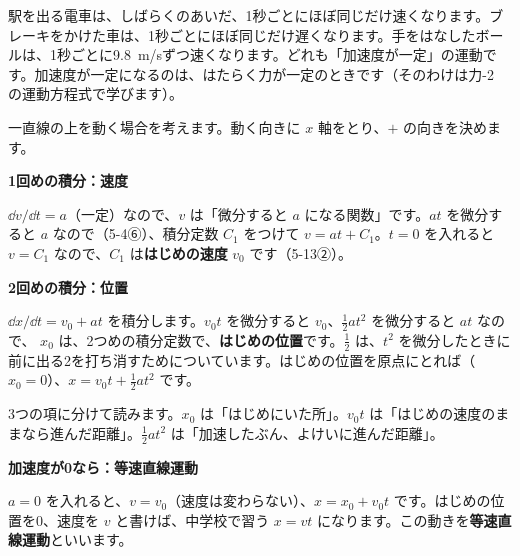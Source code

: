 
\leavevmode\label{ph:力-1:sec3}駅を出る電車は、しばらくのあいだ、1秒ごとにほぼ同じだけ速くなります。ブレーキをかけた車は、1秒ごとにほぼ同じだけ遅くなります。手をはなしたボールは、1秒ごとに\qty{9.8}{m/s}ずつ速くなります。どれも「加速度が一定」の運動です。加速度が一定になるのは、はたらく力が一定のときです（そのわけは力-2 の運動方程式で学びます）。

一直線の上を動く場合を考えます。動く向きに $x$ 軸をとり、$+$ の向きを決めます。

\begin{phmodel}[加速度が一定の運動]
\end{phmodel}

\noindent\textbf{1回めの積分：速度}\par
\noindent\label{ph:力-1:toukasoku}$\dd v/\dd t=a$（一定）なので、$v$ は「微分すると $a$ になる関数」です。$at$ を微分すると $a$ なので（\mbox{5-4⑥}）、積分定数 $C_1$ をつけて $v=at+C_1$。$t=0$ を入れると $v=C_1$ なので、$C_1$ は\textbf{はじめの速度} $v_0$ です（5-13②）。

\noindent\textbf{2回めの積分：位置}\par
\noindent $\dd x/\dd t=v_0+at$ を積分します。$v_0t$ を微分すると $v_0$、$\tfrac{1}{2}at^2$ を微分すると $at$ なので、
$x_0$ は、2つめの積分定数で、\textbf{はじめの位置}です。$\tfrac{1}{2}$ は、$t^2$ を微分したときに前に出る2を打ち消すためについています。はじめの位置を原点にとれば（$x_0=0$）、$x=v_0t+\tfrac{1}{2}at^2$ です。

\begin{phyomi}[$x=x_0+v_0t+\dfrac{1}{2}at^2$]
3つの項に分けて読みます。$x_0$ は「はじめにいた所」。$v_0t$ は「はじめの速度のままなら進んだ距離」。$\tfrac{1}{2}at^2$ は「加速したぶん、よけいに進んだ距離」。
\end{phyomi}

\noindent\textbf{加速度が0なら：等速直線運動}\par
\noindent\label{ph:力-1:tousoku}$a=0$ を入れると、$v=v_0$（速度は変わらない）、$x=x_0+v_0t$ です。はじめの位置を0、速度を $v$ と書けば、中学校で習う $x=vt$ になります。この動きを\textbf{等速直線運動}といいます。

